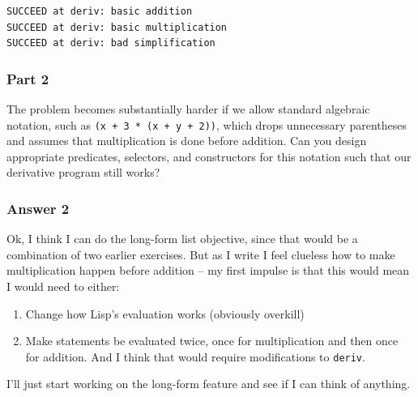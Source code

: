 \documentclass[final,fleqn,titlepage,twoside]{article}
\begin{document}
\begin{verbatim}
SUCCEED at deriv: basic addition
SUCCEED at deriv: basic multiplication
SUCCEED at deriv: bad simplification
\end{verbatim}

\subsubsection{Part 2}
\label{sec:orgaae3ac5}
The problem becomes substantially harder if we allow standard algebraic
notation, such as \texttt{(x + 3 * (x + y + 2))}, which drops unnecessary
parentheses and assumes that multiplication is done before addition. Can you
design appropriate predicates, selectors, and constructors for this notation
such that our derivative program still works?

\subsubsection{Answer 2}
\label{sec:org24b9b31}
Ok, I think I can do the long-form list objective, since that would be a
combination of two earlier exercises. But as I write I feel clueless how to
make multiplication happen before addition -- my first impulse is that this
would mean I would need to either:
\begin{enumerate}
\item Change how Lisp's evaluation works (obviously overkill)
\item Make statements be evaluated twice, once for multiplication and then once for
addition. And I think that would require modifications to \texttt{deriv}.
\end{enumerate}

I'll just start working on the long-form feature and see if I can think of
anything.
\end{document}

